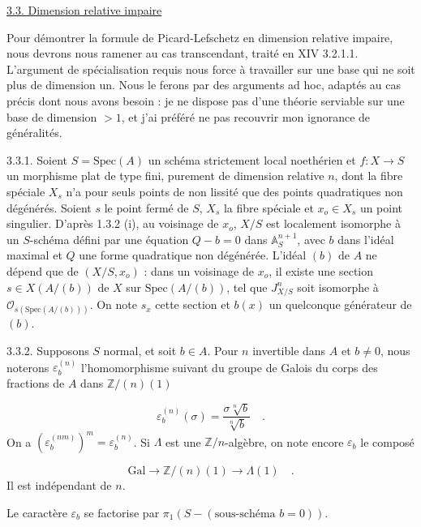 \underline{3.3. Dimension relative impaire}

Pour démontrer la formule de Picard-Lefschetz en dimension relative impaire, nous devrons nous ramener au cas transcendant, traité en XIV 3.2.1.1. L'argument de spécialisation requis nous force à travailler sur une base qui ne soit plus de dimension un. Nous le ferons par des arguments ad hoc, adaptés au cas précis dont nous avons besoin : je ne dispose pas d'une théorie serviable sur une base de dimension $>1$, et j'ai préféré ne pas recouvrir mon ignorance de généralités.

3.3.1. Soient $S=\mathrm{Spec}(A)$ un schéma strictement local noethérien et $f:X\to S$ un morphisme plat de type fini, purement de dimension relative $n$, dont la fibre spéciale $X_s$ n'a pour seuls points de non lissité que des points quadratiques non dégénérés. Soient $s$ le point fermé de $S$, $X_s$ la fibre spéciale et $x_o\in X_s$ un point singulier. D'après 1.3.2 (i), au voisinage de $x_o$, $X/S$ est localement isomorphe à un $S$-schéma défini par une équation $Q-b=0$ dans $\mathbb{A}^{n+1}_S$, avec $b$ dans l'idéal maximal et $Q$ une forme quadratique non dégénérée. L'idéal $(b)$ de $A$ ne dépend que de $(X/S,x_o)$ : dans un voisinage de $x_o$, il existe une section $s\in X(A/(b))$ de $X$ sur $\mathrm{Spec}(A/(b))$, tel que $J^n_{X/S}$ soit isomorphe à $\mathcal{O}_{s(\mathrm{Spec}(A/(b)))}$. On note $s_x$ cette section et $b(x)$ un quelconque générateur de $(b)$.



3.3.2. Supposons $S$ normal, et soit $b\in A$. Pour $n$ invertible dans $A$ et $b\neq 0$, nous noterons $\varepsilon_b^{(n)}$ l'homomorphisme suivant du groupe de Galois du corps des fractions de $A$ dans $\mathbb{Z}/(n)(1)$

\begin{equation*}
\varepsilon_b^{(n)}(\sigma)=\frac{\sigma\sqrt[n]{b}}{\sqrt[n]{b}} \quad .
\end{equation*}
On a $(\varepsilon_b^{(nm)})^m=\varepsilon_b^{(n)}$. Si $\Lambda$ est une $\mathbb{Z}/n$-algèbre, on note encore $\varepsilon_b$ le composé

\begin{equation*}
\mathrm{Gal}\longrightarrow \mathbb{Z}/(n)(1)\longrightarrow \Lambda(1) \quad .
\end{equation*}
Il est indépendant de $n$.

Le caractère $\varepsilon_b$ se factorise par $\pi_1(S-(\text{sous-schéma } b=0))$.

